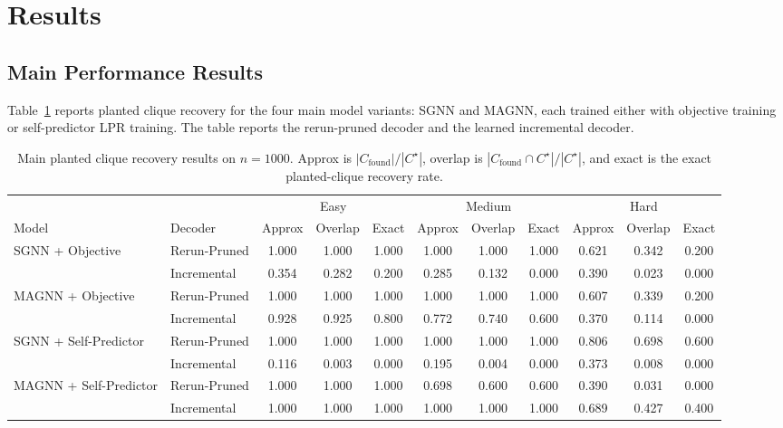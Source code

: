 \section{Results}

\subsection{Main Performance Results}

Table~\ref{tab:main-results} reports planted clique recovery for the four main model variants: SGNN and MAGNN, each trained either with objective training or self-predictor LPR training. The table reports the rerun-pruned decoder and the learned incremental decoder.

\begin{table}[t]
  \centering
  \small
  \begin{tabular}{ll|ccc|ccc|ccc}
    \toprule
    & & \multicolumn{3}{c|}{Easy} & \multicolumn{3}{c|}{Medium} & \multicolumn{3}{c}{Hard} \\
    Model & Decoder & Approx & Overlap & Exact & Approx & Overlap & Exact & Approx & Overlap & Exact \\
    \midrule
    \multirow{2}{*}{SGNN + Objective}
    & Rerun-Pruned & 1.000 & 1.000 & 1.000 & 1.000 & 1.000 & 1.000 & 0.621 & 0.342 & 0.200 \\
    & Incremental & 0.354 & 0.282 & 0.200 & 0.285 & 0.132 & 0.000 & 0.390 & 0.023 & 0.000 \\
    \midrule
    \multirow{2}{*}{MAGNN + Objective}
    & Rerun-Pruned & 1.000 & 1.000 & 1.000 & 1.000 & 1.000 & 1.000 & 0.607 & 0.339 & 0.200 \\
    & Incremental & 0.928 & 0.925 & 0.800 & 0.772 & 0.740 & 0.600 & 0.370 & 0.114 & 0.000 \\
    \midrule
    \multirow{2}{*}{SGNN + Self-Predictor}
    & Rerun-Pruned & 1.000 & 1.000 & 1.000 & 1.000 & 1.000 & 1.000 & 0.806 & 0.698 & 0.600 \\
    & Incremental & 0.116 & 0.003 & 0.000 & 0.195 & 0.004 & 0.000 & 0.373 & 0.008 & 0.000 \\
    \midrule
    \multirow{2}{*}{MAGNN + Self-Predictor}
    & Rerun-Pruned & 1.000 & 1.000 & 1.000 & 0.698 & 0.600 & 0.600 & 0.390 & 0.031 & 0.000 \\
    & Incremental & 1.000 & 1.000 & 1.000 & 1.000 & 1.000 & 1.000 & 0.689 & 0.427 & 0.400 \\
    \bottomrule
  \end{tabular}
  \caption{Main planted clique recovery results on $n=1000$. Approx is $|C_{\mathrm{found}}|/|C^\star|$, overlap is $|C_{\mathrm{found}}\cap C^\star|/|C^\star|$, and exact is the exact planted-clique recovery rate.}
  \label{tab:main-results}
\end{table}

